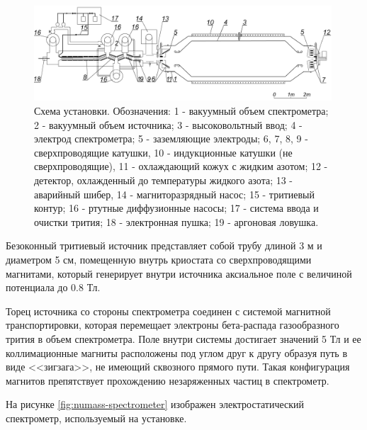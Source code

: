 \documentclass[a4paper,14pt]{extreport}
\begin{document}
\begin{figure}
  \centering
  \includegraphics[width = 0.99\textwidth]{img/nu_mass_setup/scheme.jpg}
    \caption{Схема установки. Обозначения: 1 - вакуумный объем спектрометра; 2 - вакуумный объем источника; 3 - высоковольтный ввод; 4 - электрод спектрометра; 5 - заземляющие электроды; 6, 7, 8, 9 - сверхпроводящие катушки, 10 - индукционные катушки (не сверхпроводящие), 11 - охлаждающий кожух с жидким азотом; 12 - детектор, охлажденный до температуры жидкого азота; 13 - аварийный шибер, 14 - магниторазрядный насос; 15 - тритиевый контур; 16 - ртутные диффузионные насосы; 17 - система ввода и очистки трития; 18 - электронная пушка; 19 - аргоновая ловушка.}
    \label{fig:numass-general}
\end{figure}

Безоконный тритиевый источник представляет собой трубу длиной 3 м и диаметром 5 см, помещенную внутрь криостата со сверхпроводящими магнитами, который генерирует внутри источника аксиальное поле с величиной потенциала до 0.8 Тл.

Торец источника со стороны спектрометра соединен с системой магнитной транспортировки, которая перемещает электроны бета-распада газообразного трития в объем спектрометра. Поле внутри системы достигает значений 5 Тл и ее коллимационные магниты расположены под углом друг к другу образуя путь в виде <<зигзага>>, не имеющий сквозного прямого пути. Такая конфигурация магнитов препятствует прохождению незаряженных частиц в спектрометр.

На рисунке \ref{fig:numass-spectrometer} изображен электростатический спектрометр, используемый на установке.
\end{document}
